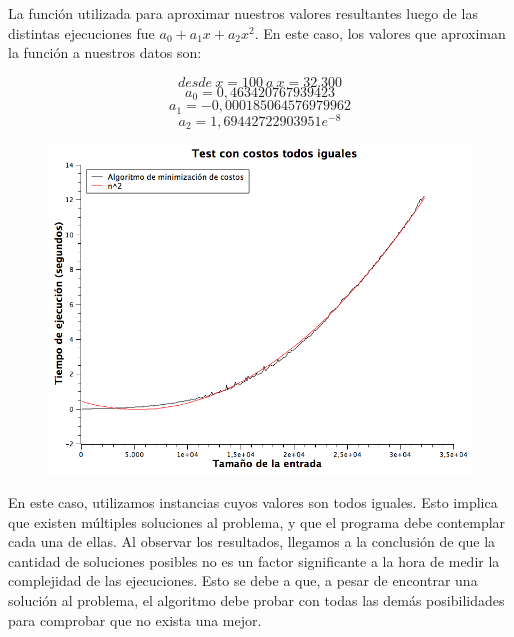 La función utilizada para aproximar nuestros valores resultantes luego de las distintas ejecuciones fue $a_{0} + a_{1}x + a_{2}x^{2}$.
En este caso, los valores que aproximan la función a nuestros datos son:

$$desde\ x = 100\ a\ x = 32.300$$
$$a_{0}  = 0,463420767939423$$
$$a_{1}  = -0,000185064576979962$$
$$a_{2}  = 1,69442722903951e^{-8}$$


\begin{figure}[H] %
\begin{center}
\includegraphics[width=350pt]{../tests/ej1/testIguales.png}
\end{center}
\end{figure}

En este caso, utilizamos instancias cuyos valores son todos iguales. Esto implica que existen múltiples soluciones al problema, y que el programa debe contemplar cada una de ellas. Al observar los resultados, llegamos a la conclusión de que la cantidad de soluciones posibles no es un factor significante a la hora de medir la complejidad de las ejecuciones. Esto se debe a que, a pesar de encontrar una solución al problema, el algoritmo debe probar con todas las demás posibilidades para comprobar que no exista una mejor.

